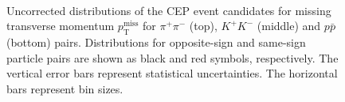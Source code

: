 \begin{figure}[h]
{  \begin{subfigure}[b]{\linewidth}\addtocounter{subfigure}{-2}\vspace*{17pt}
  \end{subfigure}\\
  \begin{minipage}[t][1.042\linewidth][t]{\linewidth}\vspace{20pt}
    \caption[....]{Uncorrected distributions of the CEP event candidates for missing transverse momentum $p_\mathrm{T}^\mathrm{\scriptscriptstyle miss}$ for $\pi^+\pi^-$ (top), $K^+K^-$ (middle) and $p\bar{p}$ (bottom) pairs. Distributions for opposite-sign and same-sign particle pairs are shown as black and red symbols, respectively. The vertical error bars represent statistical uncertainties. The horizontal bars represent bin sizes.}\label{fig:MissingPt}
  \end{minipage}
}%
\end{figure}

 





